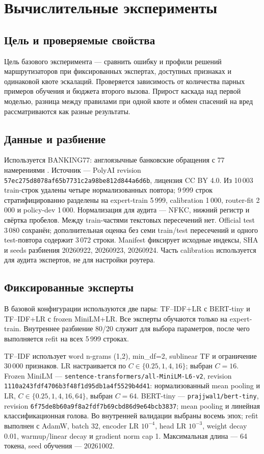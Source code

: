 \section{Вычислительные эксперименты}
\subsection{Цель и проверяемые свойства}
Цель базового эксперимента --- сравнить ошибку и профили решений
маршрутизаторов при фиксированных экспертах, доступных признаках
и одинаковой квоте эскалаций. Проверяется зависимость от количества
парных примеров обучения и бюджета второго вызова. Прирост каскада
над первой моделью, разница между правилами при одной квоте и обмен
спасений на вред рассматриваются как разные результаты.

\subsection{Данные и разбиение}
Используется BANKING77: англоязычные банковские обращения с 77
намерениями \citep{review17}. Источник --- PolyAI revision
\texttt{57ec275d8078af65b7731c2a98be812d844a6d6b}, лицензия CC BY 4.0.
Из 10\,003 train-строк удалены четыре нормализованных повтора;
9\,999 строк стратифицированно разделены на expert-train 5\,999,
calibration 1\,000, router-fit 2\,000 и policy-dev 1\,000.
Нормализация для аудита --- NFKC, нижний регистр и свёртка пробелов.
Между train-частями текстовых пересечений нет. Official test 3\,080
сохранён; дополнительная оценка без семи train/test пересечений и
одного test-повтора содержит 3\,072 строки. Manifest фиксирует
исходные индексы, SHA и seeds разбиения 20260922, 20260923, 20260924.
Часть calibration используется для аудита экспертов, не для настройки роутера.

\subsection{Фиксированные эксперты}
В базовой конфигурации используются две пары: TF--IDF+LR с BERT-tiny
и TF--IDF+LR с frozen MiniLM+LR. Все эксперты обучаются только
на expert-train. Внутреннее разбиение 80/20 служит для выбора параметров,
после чего выполняется refit на всех 5\,999 строках.

TF--IDF использует word n-grams (1,2), min\_df=2, sublinear TF
и ограничение 30\,000 признаков. LR настраивается по
$C\in\{0.25,1,4,16\}$; выбран $C=16$.
Frozen MiniLM --- \texttt{sentence-transformers/all-MiniLM-L6-v2},
revision \texttt{1110a243fdf4706b3f48f1d95db1a4f5529b4d41}:
нормализованный mean pooling и LR,
$C\in\{0.25,1,4,16,64\}$, выбран $C=64$.
BERT-tiny --- \texttt{prajjwal1/bert-tiny}, revision
\texttt{6f75de8b60a9f8a2fdf7b69cbd86d9e64bcb3837};
mean pooling и линейная классификационная голова.
Во внутренней валидации выбраны восемь эпох; refit выполнен с AdamW,
batch 32, encoder LR $10^{-4}$, head LR $10^{-3}$,
weight decay 0.01, warmup/linear decay и gradient norm cap 1.
Максимальная длина --- 64 токена, seed обучения --- 20261002.

